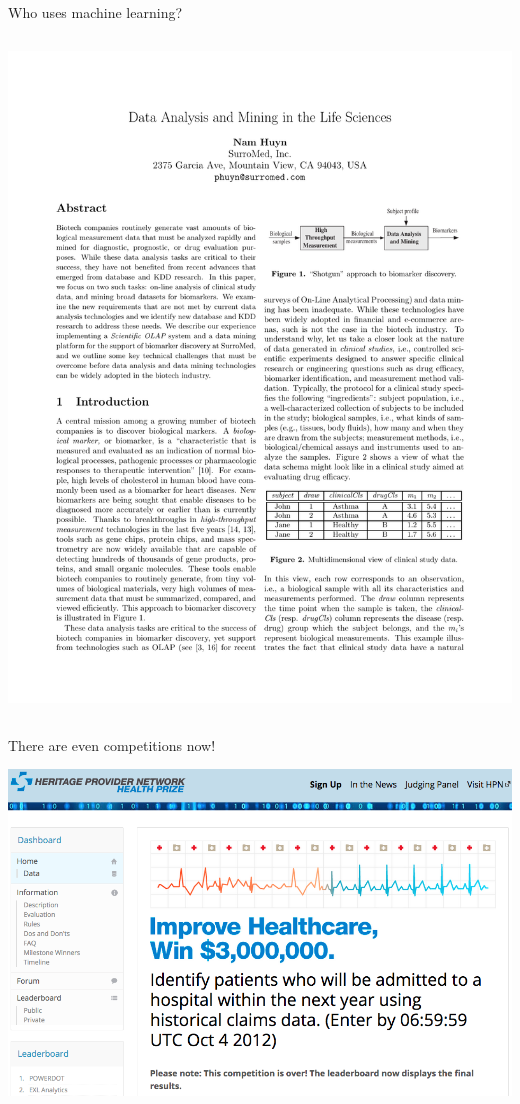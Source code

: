 \documentclass[pdf]{beamer}
\begin{document}
\begin{frame}{Who uses machine learning?}
\begin{columns}
\begin{center}
	\includegraphics[width=\textwidth]{useML04.pdf}
\end{center}
\end{columns}
\end{frame}
\begin{frame}{There are even competitions now!}
\begin{center}
	\includegraphics[width=\textwidth]{competition.png}
\end{center}
\end{frame}
\end{document}
